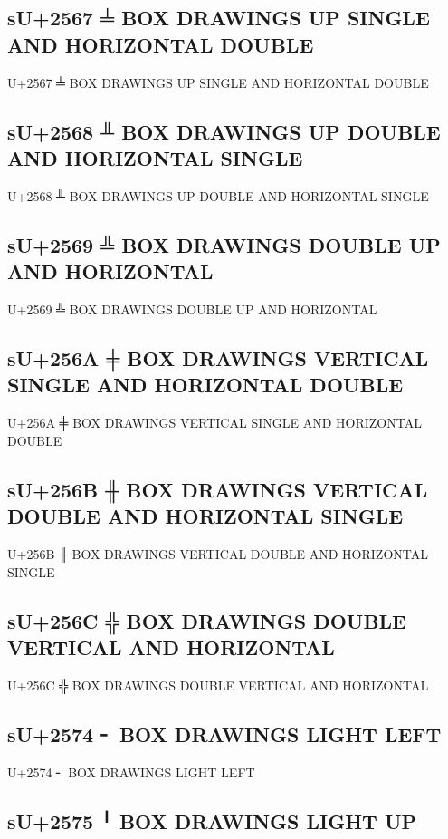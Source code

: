 \subsection{sU+2567 ╧ BOX DRAWINGS UP SINGLE AND HORIZONTAL DOUBLE}

U+2567 ╧ BOX DRAWINGS UP SINGLE AND HORIZONTAL DOUBLE

\subsection{sU+2568 ╨ BOX DRAWINGS UP DOUBLE AND HORIZONTAL SINGLE}

U+2568 ╨ BOX DRAWINGS UP DOUBLE AND HORIZONTAL SINGLE

\subsection{sU+2569 ╩ BOX DRAWINGS DOUBLE UP AND HORIZONTAL}

U+2569 ╩ BOX DRAWINGS DOUBLE UP AND HORIZONTAL

\subsection{sU+256A ╪ BOX DRAWINGS VERTICAL SINGLE AND HORIZONTAL DOUBLE}

U+256A ╪ BOX DRAWINGS VERTICAL SINGLE AND HORIZONTAL DOUBLE

\subsection{sU+256B ╫ BOX DRAWINGS VERTICAL DOUBLE AND HORIZONTAL SINGLE}

U+256B ╫ BOX DRAWINGS VERTICAL DOUBLE AND HORIZONTAL SINGLE

\subsection{sU+256C ╬ BOX DRAWINGS DOUBLE VERTICAL AND HORIZONTAL}

U+256C ╬ BOX DRAWINGS DOUBLE VERTICAL AND HORIZONTAL

\subsection{sU+2574 ╴ BOX DRAWINGS LIGHT LEFT}

U+2574 ╴ BOX DRAWINGS LIGHT LEFT

\subsection{sU+2575 ╵ BOX DRAWINGS LIGHT UP}

